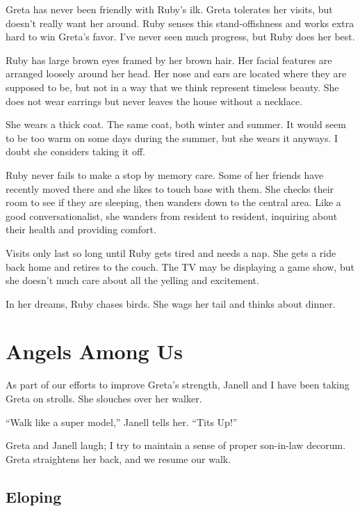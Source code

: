 \documentclass[
  letterpaper,
  DIV=11,
  numbers=noendperiod]{scrreprt}
\begin{document}
Greta has never been friendly with Ruby's ilk. Greta tolerates her
visits, but doesn't really want her around. Ruby senses this
stand-offishness and works extra hard to win Greta's favor. I've never
seen much progress, but Ruby does her best.

Ruby has large brown eyes framed by her brown hair. Her facial features
are arranged loosely around her head. Her nose and ears are located
where they are supposed to be, but not in a way that we think represent
timeless beauty. She does not wear earrings but never leaves the house
without a necklace.

She wears a thick coat. The same coat, both winter and summer. It would
seem to be too warm on some days during the summer, but she wears it
anyways. I doubt she considers taking it off.

Ruby never fails to make a stop by memory care. Some of her friends have
recently moved there and she likes to touch base with them. She checks
their room to see if they are sleeping, then wanders down to the central
area. Like a good conversationalist, she wanders from resident to
resident, inquiring about their health and providing comfort.

Visits only last so long until Ruby gets tired and needs a nap. She gets
a ride back home and retires to the couch. The TV may be displaying a
game show, but she doesn't much care about all the yelling and
excitement.

In her dreams, Ruby chases birds. She wags her tail and thinks about
dinner.


\chapter*{Angels Among Us}\label{angels-among-us}


As part of our efforts to improve Greta's strength, Janell and I have
been taking Greta on strolls. She slouches over her walker.

``Walk like a super model,'' Janell tells her. ``Tits Up!''

Greta and Janell laugh; I try to maintain a sense of proper son-in-law
decorum. Greta straightens her back, and we resume our walk.

\section*{Eloping}\label{eloping}
\end{document}
